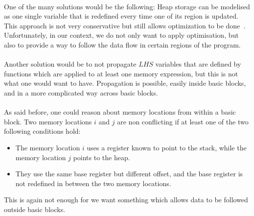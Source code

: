 \paragraph{}
One of the many solutions would be the following: Heap storage can be modelised as one single variable that is redefined every time one of its region is updated. This approach is not very conservative but still allows optimization to be done~\cite{cytron1991efficiently}. Unfortunately, in our context, we do not only want to apply optimisation, but also to provide a way to follow the data flow in certain regions of the program. 

\paragraph{}
Another solution would be to not propagate $LHS$ variables that are defined by functions which are applied to at least one memory expression, but this is not what one would want to have. Propagation is possible, easily inside basic blocks, and in a more complicated way across basic blocks.

\paragraph{}
As said before, one could reason about memory locations from within a basic block. Two memory locations $i$ and $j$ are non conflicting if at least one of the two following conditions hold:
\begin{itemize}
	\item The memory location $i$ uses a register known to point to the stack, while the memory location $j$ points to the heap. 
	\item They use the same base register but different offset, and the base register is not redefined in between the two memory locations.
\end{itemize}
This is again not enough for we want something which allows data to be followed outside basic blocks.

